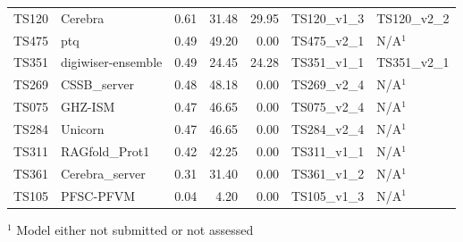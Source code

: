 \begin{table}[ht]
{\begin{tabular}{llrrrll}
TS120 & Cerebra & 0.61 & 31.48 & 29.95 & TS120\_v1\_3 & TS120\_v2\_2 \\ 
TS475 & ptq & 0.49 & 49.20 & 0.00 & TS475\_v2\_1 & N/A$^{1}$ \\ 
TS351 & digiwiser-ensemble & 0.49 & 24.45 & 24.28 & TS351\_v1\_1 & TS351\_v2\_1 \\ 
TS269 & CSSB\_server & 0.48 & 48.18 & 0.00 & TS269\_v2\_4 & N/A$^{1}$ \\ 
TS075 & GHZ-ISM & 0.47 & 46.65 & 0.00 & TS075\_v2\_4 & N/A$^{1}$ \\ 
TS284 & Unicorn & 0.47 & 46.65 & 0.00 & TS284\_v2\_4 & N/A$^{1}$ \\ 
TS311 & RAGfold\_Prot1 & 0.42 & 42.25 & 0.00 & TS311\_v1\_1 & N/A$^{1}$ \\ 
TS361 & Cerebra\_server & 0.31 & 31.40 & 0.00 & TS361\_v1\_2 & N/A$^{1}$ \\ 
TS105 & PFSC-PFVM & 0.04 & 4.20 & 0.00 & TS105\_v1\_3 & N/A$^{1}$ \\ 
\bottomrule
\end{tabular}%
}
\begin{flushleft}\footnotesize $^{1}$ Model either not submitted or not assessed\end{flushleft}
\end{table}
